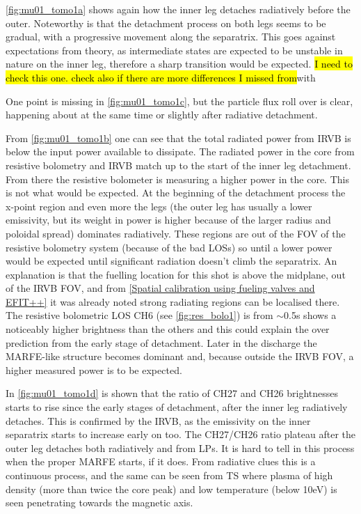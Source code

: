 \autoref{fig:mu01_tomo1a} shows again how the inner leg detaches radiatively before the outer. Noteworthy is that the detachment process on both legs seems to be gradual, with a progressive movement along the separatrix. This goes against expectations from theory, as intermediate states are expected to be unstable in nature on the inner leg, therefore a sharp transition would be expected.\cite{Lipschultz2016} \hl{I need to check this one. check also if there are more differences I missed from}with \cite{Fevrier2021}

One point is missing in \autoref{fig:mu01_tomo1c}, but the particle flux roll over is clear, happening about at the same time or slightly after radiative detachment.

From \autoref{fig:mu01_tomo1b} one can see that the total radiated power from IRVB is below the input power available to dissipate. The radiated power in the core from resistive bolometry and IRVB match up to the start of the inner leg detachment. From there the resistive bolometer is measuring a higher power in the core. This is not what would be expected. At the beginning of the detachment process the x-point region and even more the legs (the outer leg has usually a lower emissivity, but its weight in power is higher because of the larger radius and poloidal spread) dominates radiatively. These regions are out of the FOV of the resistive bolometry system (because of the bad LOSs) so until a lower power would be expected until significant radiation doesn't climb the separatrix. An explanation is that the fuelling location for this shot is above the midplane, out of the IRVB FOV, and from \autoref{Spatial calibration using fueling valves and EFIT++} it was already noted strong radiating regions can be localised there. The resistive bolometric LOS CH6 (see \autoref{fig:res_bolo1}) is from $\sim$0.5s shows a noticeably higher brightness than the others and this could explain the over prediction from the early stage of detachment. Later in the discharge the MARFE-like structure becomes dominant and, because outside the IRVB FOV, a higher measured power is to be expected.

In \autoref{fig:mu01_tomo1d} is shown that the ratio of CH27 and CH26 brightnesses starts to rise since the early stages of detachment, after the inner leg radiatively detaches. This is confirmed by the IRVB, as the emissivity on the inner separatrix starts to increase early on too. The CH27/CH26 ratio plateau after the outer leg detaches both radiatively and from LPs. It is hard to tell in this process when the proper MARFE starts, if it does. From radiative clues this is a continuous process, and the same can be seen from TS where plasma of high density (more than twice the core peak) and low temperature (below 10eV) is seen penetrating towards the magnetic axis.

